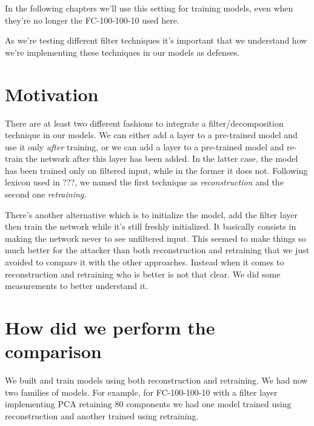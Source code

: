 In the following chapters we'll use this setting for training models,
even when they're no longer the FC-100-100-10 used here.


As we're testing different filter techniques it's important that we
understand how we're implementing these techniques in our models as
defenses.

\section{Motivation}
\label{sec:motivation}
There are at least two different fashions to integrate a
filter/decomposition technique in our models. We can either add a layer
to a pre-trained model and use it only \emph{after} training, or we can
add a layer to a pre-trained model and re-train the network after this
layer has been added. In the latter case, the model has been trained
only on filtered input, while in the former it does not. Following
lexicon used in ???, we named the first technique as
\emph{reconstruction} and the second one \emph{retraining}.

There's another alternative which is to initialize the model, add the
filter layer then train the network while it's still freshly
initialized. It basically consists in making the network never to see
unfiltered input. This seemed to make things so much better for the
attacker than both reconstruction and retraining that we just avoided
to compare it with the other approaches. Instead when it comes to
reconstruction and retraining who is better is not that clear. We did
some measurements to better understand it.

\section{How did we perform the comparison}

We built and train models using both reconstruction and retraining. We
had now two families of models. For example, for FC-100-100-10 with a
filter layer implementing PCA retaining 80 components we had one model
trained using reconstruction and another trained using retraining.

